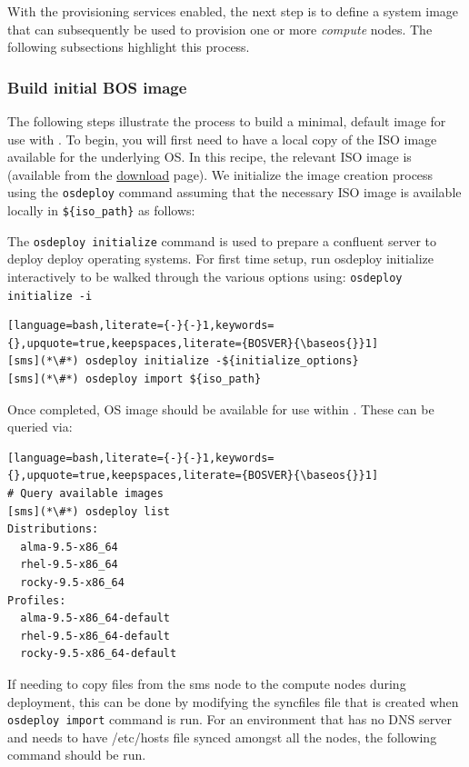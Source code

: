 
With the provisioning services enabled, the next step is to define
a system image that can subsequently be
used to provision one or more {\em compute} nodes. The following subsections highlight this process.

\subsubsection{Build initial BOS image} \label{sec:assemble_bos}
The following steps illustrate the process to build a minimal, default image for use with \Confluent{}. To begin, you will
first need to have a local copy of the ISO image available for the underlying OS. In this recipe, the relevant ISO image
is \texttt{\isoimage{}} (available from the \OS{}
\href{\downloadpage{}}{\color{blue}download} page).
We initialize the image
creation process using the \texttt{osdeploy} command assuming that the necessary ISO image is available locally in
\texttt{\$\{iso\_path\}} as follows:

The \texttt{osdeploy initialize} command is used to prepare a confluent server to deploy deploy operating systems.
For first time setup, run osdeploy initialize interactively to be walked through the various options using:
\texttt{osdeploy initialize -i}

\begin{lstlisting}[language=bash,literate={-}{-}1,keywords={},upquote=true,keepspaces,literate={BOSVER}{\baseos{}}1]
[sms](*\#*) osdeploy initialize -${initialize_options}
[sms](*\#*) osdeploy import ${iso_path}

\end{lstlisting}

\noindent Once completed, OS image should be available for use within \Confluent{}. These can be queried via:

\begin{lstlisting}[language=bash,literate={-}{-}1,keywords={},upquote=true,keepspaces,literate={BOSVER}{\baseos{}}1]
# Query available images
[sms](*\#*) osdeploy list
Distributions:
  alma-9.5-x86_64
  rhel-9.5-x86_64
  rocky-9.5-x86_64
Profiles:
  alma-9.5-x86_64-default
  rhel-9.5-x86_64-default
  rocky-9.5-x86_64-default
\end{lstlisting}

If needing to copy files from the sms node to the compute nodes during deployment, this can be done by
modifying the syncfiles file that is created when \texttt{osdeploy import} command is run. For an environment
that has no DNS server and needs to have /etc/hosts file synced amongst all the nodes, the following command
should be run.


